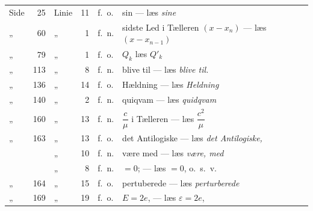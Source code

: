\documentclass[12pt,a4paper]{book}
\begin{document}
\begingroup
\small
\setlength{\tabcolsep}{4pt}
\begin{center}
\begin{tabular}{@{}l r l r l l@{}}
Side & 25 & Linie & 11 & f.\ o. & sin --- læs \emph{sine}\\
„ & 60 & „ & 1 & f.\ n. & sidste Led i Tælleren $(x-x_{n})$ --- læs $(x-x_{n-1})$\\
„ & 79 & „ & 1 & f.\ o. & $Q_{k}$ læs $Q'_{k}$\\
„ & 113 & „ & 8 & f.\ n. & blive til --- læs \emph{blive til.}\\
„ & 136 & „ & 14 & f.\ o. & Hældning --- læs \emph{Heldning}\\
„ & 140 & „ & 2 & f.\ n. & quiqvam --- læs \emph{quidqvam}\\
„ & 160 & „ & 13 & f.\ n. & $\dfrac{c}{\mu}$ i Tælleren --- læs $\dfrac{c^{2}}{\mu}$\\
„ & 163 & „ & 13 & f.\ o. & det Antilogiske --- læs \emph{det Antilogiske,}\\
 & & „ & 10 & f.\ n. & være med --- læs \emph{være, med}\\
 & & „ & 8 & f.\ n. & $=0$; --- læs $=0$, o.\ s.\ v.\\
„ & 164 & „ & 15 & f.\ o. & pertuberede --- læs \emph{perturberede}\\
„ & 169 & „ & 19 & f.\ o. & $E=2e$, --- læs $\varepsilon = 2e$,\\

\end{tabular}
\end{center}
\end{document}
